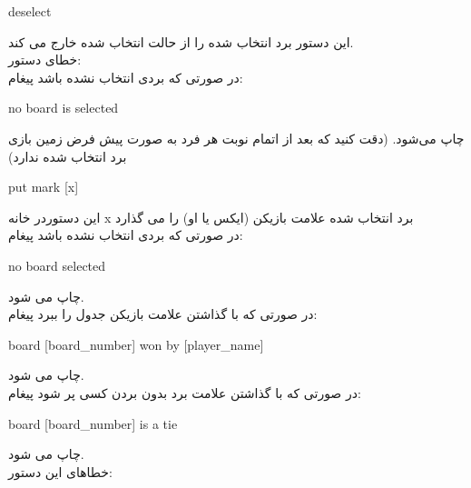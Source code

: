 \documentclass[]{article}
\begin{document}
\hrulefill

\begin{tcolorbox}[boxrule=0pt]
	\begin{latin}
  	  \large{
  	  	deselect
		}
	\end{latin}
\end{tcolorbox}

این دستور برد انتخاب شده را از حالت انتخاب شده خارج می کند.\\
خطای دستور:\\
در صورتی که بردی انتخاب نشده باشد پیغام:


\begin{tcolorbox}[boxrule=0pt]
	\begin{latin}
  	  \large{
  	  	no board is selected
		}
	\end{latin}
\end{tcolorbox}
چاپ می‌شود.
(دقت کنید که بعد از اتمام نوبت هر فرد به صورت پیش فرض زمین بازی برد انتخاب شده ندارد)
\newpage
\begin{tcolorbox}[boxrule=0pt]
	\begin{latin}
  	  \large{
  	  	put mark [x]
		}
	\end{latin}
\end{tcolorbox}
این دستوردر خانه x برد انتخاب شده علامت بازیکن (ایکس یا او) را می گذارد\\
در صورتی که بردی انتخاب نشده باشد پیغام:
\begin{tcolorbox}[boxrule=0pt]
	\begin{latin}
  	  \large{
  	  	no board selected
		}
	\end{latin}
\end{tcolorbox}

چاپ می شود.\\
در صورتی که با گذاشتن علامت بازیکن جدول را ببرد پیغام:
\begin{tcolorbox}[boxrule=0pt]
	\begin{latin}
		\large{
			board [board\_number] won by [player\_name]
		}
	\end{latin}
\end{tcolorbox}
چاپ می شود.\\
در صورتی که با گذاشتن علامت برد بدون بردن کسی پر شود پیغام:

\begin{tcolorbox}[boxrule=0pt]
	\begin{latin}
		\large{
			board [board\_number] is a tie
		}
	\end{latin}
\end{tcolorbox}
چاپ می شود.\\
خطاهای این دستور:
\end{document}
